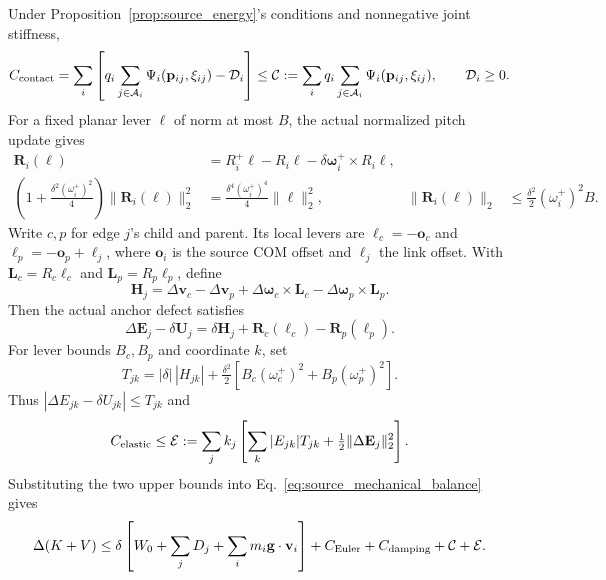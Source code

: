 \begin{proposition}
\label{prop:source_energy_upper}
Under Proposition~\ref{prop:source_energy}'s conditions and nonnegative joint stiffness,
\begin{equation}
 C_{\rm contact}=\sum_i\left[q_i\sum_{j\in\mathcal A_i}
 \Psi_i(\mathbf p_{ij},\xi_{ij})-\mathcal D_i\right]
 \le\mathcal C:=\sum_iq_i\sum_{j\in\mathcal A_i}\Psi_i(\mathbf p_{ij},\xi_{ij}),
 \qquad\mathcal D_i\ge0.
 \label{eq:contact_energy_upper}
\end{equation}
For a fixed planar lever $\boldsymbol\ell$ of norm at most $B$, the actual normalized pitch update gives
\begin{align}
 \mathbf R_i(\boldsymbol\ell)&=R_i^+\boldsymbol\ell-R_i\boldsymbol\ell
  -\delta\boldsymbol\omega_i^+\times R_i\boldsymbol\ell,\nonumber\\
 \left(1+\tfrac{\delta^2(\omega_i^+)^2}{4}\right)
  \|\mathbf R_i(\boldsymbol\ell)\|_2^2
  &=\tfrac{\delta^4(\omega_i^+)^4}{4}\|\boldsymbol\ell\|_2^2,
 &\|\mathbf R_i(\boldsymbol\ell)\|_2&\le\tfrac{\delta^2}{2}(\omega_i^+)^2B.
 \label{eq:rotation_second_order}
\end{align}
Write $c,p$ for edge $j$'s child and parent.
Its local levers are $\boldsymbol\ell_c=-\mathbf o_c$ and $\boldsymbol\ell_p=-\mathbf o_p+\ell_j$,
where $\mathbf o_i$ is the source COM offset and $\ell_j$ the link offset.
With $\mathbf L_c=R_c\boldsymbol\ell_c$ and $\mathbf L_p=R_p\boldsymbol\ell_p$, define
\begin{equation}
 \mathbf H_j=\Delta\mathbf v_c-\Delta\mathbf v_p+
 \Delta\boldsymbol\omega_c\times\mathbf L_c-
 \Delta\boldsymbol\omega_p\times\mathbf L_p.
\end{equation}
Then the actual anchor defect satisfies
\begin{equation}
 \Delta\mathbf E_j-\delta\mathbf U_j=
 \delta\mathbf H_j+\mathbf R_c(\boldsymbol\ell_c)-\mathbf R_p(\boldsymbol\ell_p).
 \label{eq:anchor_taylor_defect}
\end{equation}
For lever bounds $B_c,B_p$ and coordinate $k$, set
\begin{equation}
 T_{jk}=|\delta|\,|H_{jk}|+\tfrac{\delta^2}{2}
  [B_c(\omega_c^+)^2+B_p(\omega_p^+)^2].
\end{equation}
Thus $|\Delta E_{jk}-\delta U_{jk}|\le T_{jk}$ and
\begin{equation}
 C_{\rm elastic}\le\mathcal E:=\sum_jk_j\left[
 \sum_k|E_{jk}|T_{jk}+\tfrac12\|\Delta\mathbf E_j\|_2^2\right].
 \label{eq:elastic_energy_upper}
\end{equation}
Substituting the two upper bounds into Eq.~\eqref{eq:source_mechanical_balance} gives
\begin{equation}
 \Delta(K+V)\le\delta\left[W_0+\sum_jD_j+\sum_im_i\mathbf g\cdot\mathbf v_i\right]
 +C_{\rm Euler}+C_{\rm damping}+\mathcal C+\mathcal E.
 \label{eq:source_mechanical_upper}
\end{equation}
\end{proposition}

